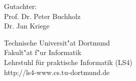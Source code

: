 \begin{titlepage}
\hspace*{\links}
\begin{minipage}[b]{5cm}
\raggedright
Gutachter: \\
Prof. Dr. Peter Buchholz\\
Dr. Jan Kriege\\
\end{minipage}

\vspace*{2.5cm}
\hspace*{\links}
\begin{minipage}[b]{8cm}
\raggedright
Technische Universit"at Dortmund \\
Fakult"at f"ur Informatik\\
Lehrstuhl für praktische Informatik (LS4)\\
http://ls4-www.cs.tu-dortmund.de
\end{minipage}

\end{titlepage}
